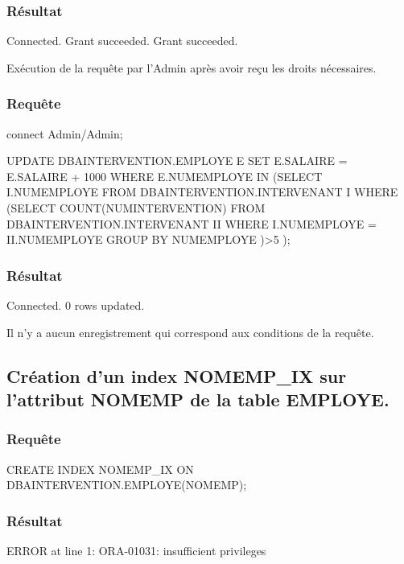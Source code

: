 \documentclass[•]{article}
\begin{document}
\subsubsection{Résultat}
\begin{sql}
Connected.
Grant succeeded.
Grant succeeded.
\end{sql}
\textrm{Exécution de la requête par l'Admin après avoir reçu les droits nécessaires.}

\subsubsection{Requête}
\begin{sql}
connect Admin/Admin;
	
UPDATE DBAINTERVENTION.EMPLOYE E 
SET E.SALAIRE = E.SALAIRE + 1000 
WHERE E.NUMEMPLOYE IN 
	(SELECT I.NUMEMPLOYE 
	FROM DBAINTERVENTION.INTERVENANT I 
	WHERE (SELECT COUNT(NUMINTERVENTION) 
		   FROM DBAINTERVENTION.INTERVENANT II
		   WHERE I.NUMEMPLOYE = II.NUMEMPLOYE
		   GROUP BY NUMEMPLOYE 
		   )>5
	);
\end{sql}

\subsubsection{Résultat}
\begin{sql}
Connected.
0 rows updated.
\end{sql}

\textrm{Il n'y a aucun enregistrement qui correspond aux conditions de la requête.}


\subsection{Création d'un index NOMEMP\_IX sur l’attribut NOMEMP de la table EMPLOYE.}
\subsubsection{Requête}
\begin{sql}
CREATE INDEX NOMEMP_IX ON DBAINTERVENTION.EMPLOYE(NOMEMP);
\end{sql}

\subsubsection{Résultat}
\begin{sql}
ERROR at line 1:
ORA-01031: insufficient privileges
\end{sql}
\end{document}
